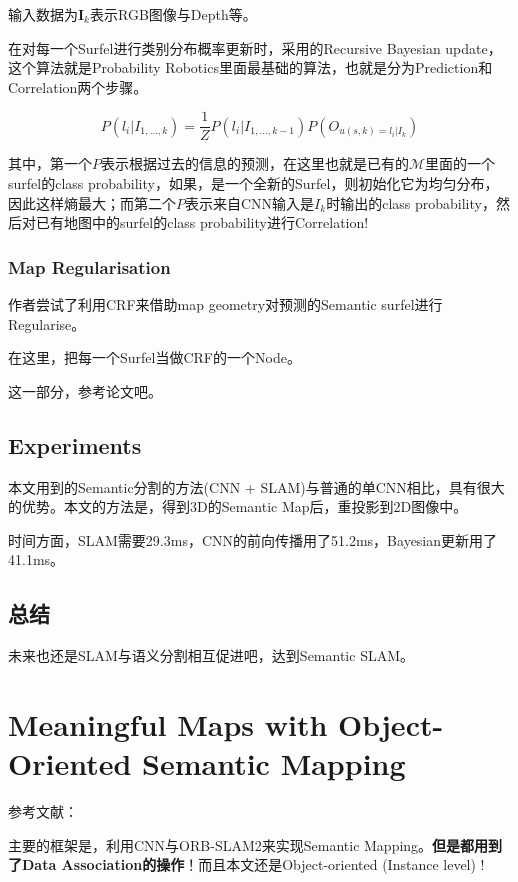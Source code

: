 输入数据为$\mathbf{I}_k$表示RGB图像与Depth等。

在对每一个Surfel进行类别分布概率更新时，采用的Recursive Bayesian update，这个算法就是Probability Robotics里面最基础的算法，也就是分为Prediction和Correlation两个步骤。

\begin{displaymath}
P(l_i | I_{1, \ldots, k}) = \frac{1}{Z}P(l_i | I_{1, \ldots, k- 1})P(O_{u(s, k)=l_i | I_k})
\end{displaymath}

其中，第一个$P$表示根据过去的信息的预测，在这里也就是已有的$\mathcal{M}$里面的一个surfel的class probability，如果，是一个全新的Surfel，则初始化它为均匀分布，因此这样熵最大；而第二个$P$表示来自CNN输入是$I_k$时输出的class probability，然后对已有地图中的surfel的class probability进行Correlation!

\subsubsection{Map Regularisation}

作者尝试了利用CRF来借助map geometry对预测的Semantic surfel进行Regularise。

在这里，把每一个Surfel当做CRF的一个Node。

这一部分，参考论文吧。

\subsection{Experiments}

本文用到的Semantic分割的方法(CNN + SLAM)与普通的单CNN相比，具有很大的优势。本文的方法是，得到3D的Semantic Map后，重投影到2D图像中。

时间方面，SLAM需要29.3ms，CNN的前向传播用了51.2ms，Bayesian更新用了41.1ms。

\subsection{总结}

未来也还是SLAM与语义分割相互促进吧，达到Semantic SLAM。


\section{Meaningful Maps with Object-Oriented Semantic Mapping}
参考文献：\cite{Meaningful2016}

主要的框架是，利用CNN与ORB-SLAM2来实现Semantic Mapping。{\bfseries 但是都用到了Data Association的操作}！而且本文还是Object-oriented (Instance level) !

